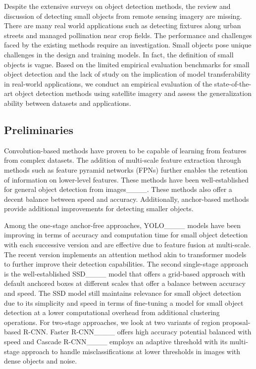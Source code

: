 Despite the extensive surveys on object detection methods, the review and discussion of detecting small objects from remote sensing imagery are missing. There are many real world applications such as detecting fixtures along urban streets and managed pollination near crop fields. The performance and challenges faced by the existing methods require an investigation. Small objects pose unique challenges in the design and training models. In fact, the definition of small objects is vague. %
Based on the limited empirical evaluation benchmarks for small object detection and the lack of study on the implication of model transferability in real-world applications, we conduct an empirical evaluation of the state-of-the-art object detection methods using satellite imagery and assess the generalization ability between datasets and applications.



\subsection{Preliminaries}

Convolution-based methods have proven to be capable of learning from features from complex datasets. The addition of multi-scale feature extraction through methods such as feature pyramid networks (FPNs) further enables the retention of information on lower-level features. These methods have been well-established for general object detection from images____. These methods also offer a decent balance between speed and accuracy. Additionally, anchor-based methods provide additional improvements for detecting smaller objects.

Among the one-stage anchor-free approaches, YOLO____ models have been improving in terms of accuracy and computation time for small object detection with each successive version and are effective due to feature fusion at multi-scale. The recent version implements an attention method akin to transformer models to further improve their detection capabilities. The second single-stage approach is the well-established SSD____ model that offers a grid-based approach with default anchored boxes at different scales that offer a balance between accuracy and speed. The SSD model still maintains relevance for small object detection due to its simplicity and speed in terms of fine-tuning a model for small object detection at a lower computational overhead from additional clustering operations. For two-stage approaches, we look at two variants of region proposal-based R-CNN. Faster R-CNN____ offers high accuracy potential balanced with speed and Cascade R-CNN____ employs an adaptive threshold with its multi-stage approach to handle misclassifications at lower thresholds in images with dense objects and noise.

